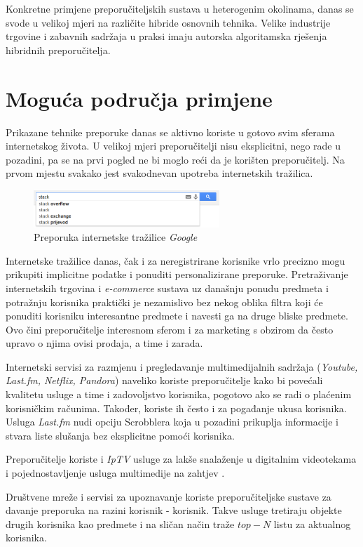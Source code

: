 \documentclass[times, utf8, diplomski, numeric]{fer}
\begin{document}
Konkretne primjene preporučiteljskih sustava u heterogenim okolinama, danas se
svode u velikoj mjeri na različite hibride osnovnih tehnika. Velike industrije
trgovine i zabavnih sadržaja u praksi imaju autorska algoritamska rješenja
hibridnih preporučitelja.
\section{Moguća područja primjene}
Prikazane tehnike preporuke danas se aktivno koriste u gotovo svim sferama
internetskog života. U velikoj mjeri preporučitelji nisu eksplicitni, nego rade
u pozadini, pa se na prvi pogled ne bi moglo reći da je korišten preporučitelj.
Na prvom mjestu svakako jest svakodnevan upotreba internetskih tražilica.
\begin{figure}[!htb]
	\centering
	\includegraphics[width=7cm]{images/google.png}
	\caption{Preporuka internetske tražilice \emph{Google}}
	\label{fig:google}
\end{figure}
Internetske tražilice danas, čak i za neregistrirane korisnike vrlo precizno
mogu prikupiti implicitne podatke i ponuditi personalizirane preporuke.
Pretraživanje internetskih trgovina i \emph{e-commerce} sustava uz današnju
ponudu predmeta i potražnju korisnika praktički je nezamislivo bez nekog oblika
filtra koji će ponuditi korisniku interesantne predmete i navesti ga na druge
bliske predmete. Ovo čini preporučitelje interesnom sferom i za marketing s
obzirom da često upravo o njima ovisi prodaja, a time i zarada.

Internetski servisi za razmjenu i pregledavanje multimedijalnih sadržaja
(\emph{Youtube, Last.fm, Netflix, Pandora}) naveliko koriste preporučitelje kako
bi povećali kvalitetu usluge a time i zadovoljstvo korisnika, pogotovo ako se
radi o plaćenim korisničkim računima. Također, koriste ih često i za pogađanje
ukusa korisnika. Usluga \emph{Last.fm} nudi opciju \glqq Scrobblera \grqq koja u
pozadini prikuplja informacije i stvara liste slušanja bez eksplicitne pomoći
korisnika.

Preporučitelje koriste i \emph{IpTV} usluge 
za lakše snalaženje u digitalnim videotekama i pojednostavljenje usluga
multimedije na zahtjev .

Društvene mreže i servisi za upoznavanje koriste preporučiteljske sustave za
davanje preporuka na razini korisnik - korisnik. Takve usluge tretiraju objekte
drugih korisnika kao predmete i na sličan način traže $top-N$ listu za aktualnog
korisnika.
\end{document}

